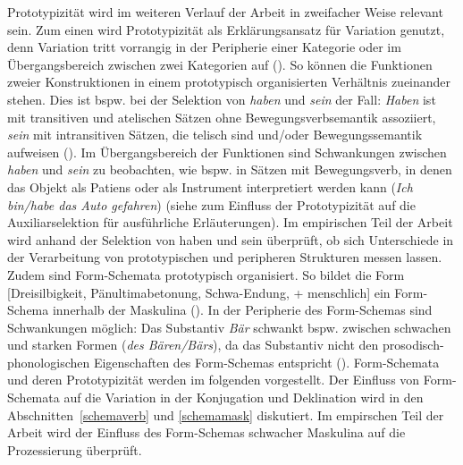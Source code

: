 Prototypizität wird im weiteren Verlauf der Arbeit in zweifacher Weise relevant sein. Zum einen wird Prototypizität als Erklärungsansatz für Variation genutzt, denn Variation tritt vorrangig in der Peripherie einer Kategorie oder im Übergangsbereich zwischen zwei Kategorien auf (\cite[67--68]{Agel.2008}). So können die Funktionen zweier Konstruktionen in einem prototypisch organisierten Verhältnis zueinander stehen. Dies ist bspw. bei der Selektion von \textit{haben} und \textit{sein} der Fall: \textit{Haben} ist mit transitiven und atelischen Sätzen ohne Bewegungsverbsemantik assoziiert, \textit{sein} mit intransitiven Sätzen, die telisch sind und/oder Bewegungssemantik aufweisen (\cite[316--319]{Gillmann.2016}). Im Übergangsbereich der Funktionen sind Schwankungen zwischen \textit{haben} und \textit{sein} zu beobachten, wie bspw. in Sätzen mit Bewegungsverb, in denen das Objekt als Patiens oder als Instrument interpretiert werden kann (\textit{Ich bin/habe das Auto gefahren}) (siehe  zum Einfluss der Prototypizität auf die Auxiliarselektion für ausführliche Erläuterungen). Im empirischen Teil der Arbeit wird anhand der Selektion von haben und sein überprüft, ob sich Unterschiede in der Verarbeitung von prototypischen und peripheren Strukturen messen lassen. Zudem sind Form-Schemata prototypisch organisiert. So bildet die Form [Dreisilbigkeit, Pänultimabetonung, Schwa-Endung, + menschlich] ein Form-Schema innerhalb der Maskulina (\cite[168--176]{Kopcke.1995}). In der Peripherie des Form-Schemas sind Schwankungen möglich: Das Substantiv \textit{Bär} schwankt bspw. zwischen schwachen und starken Formen (\textit{des Bären/Bärs}), da das Substantiv nicht den prosodisch-phonologischen Eigenschaften des Form-Schemas entspricht (\cite[69]{Kopcke.2005}). Form-Schemata und deren Prototypizität werden im folgenden  vorgestellt. Der Einfluss von Form-Schemata auf die Variation in der Konjugation und Deklination wird in den Abschnitten~\ref{schemaverb} und \ref{schemamask} diskutiert. Im empirschen Teil der Arbeit wird der Einfluss des Form-Schemas schwacher Maskulina auf die Prozessierung überprüft.

